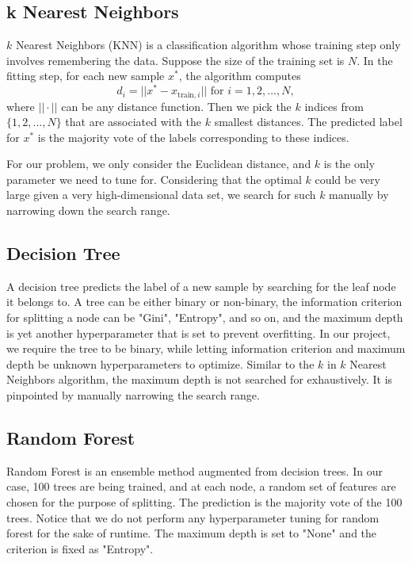\documentclass[10pt,twocolumn,letterpage]{article}
\begin{document}
		\subsection{k Nearest Neighbors}
			$k$ Nearest Neighbors (KNN) is a classification algorithm whose training step only involves remembering the data. Suppose the size of the training set is $N$. In the fitting step, for each new sample $x^*$, the algorithm computes $$d_i = ||x^* - x_{\text{train},i}|| \text{ for } i = 1,2,...,N,$$ where $||\cdot||$ can be any distance function. Then we pick the $k$ indices from $\{1,2,...,N\}$ that are associated with the $k$ smallest distances. The predicted label for $x^*$ is the majority vote of the labels corresponding to these indices. 
			
			For our problem, we only consider the Euclidean distance, and $k$ is the only parameter we need to tune for. Considering that the optimal $k$ could be very large given a very high-dimensional data set, we search for such $k$ manually by narrowing down the search range.
		\subsection{Decision Tree}
			A decision tree predicts the label of a new sample by searching for the leaf node it belongs to. A tree can be either binary or non-binary, the information criterion for splitting a node can be "Gini", "Entropy", and so on, and the maximum depth is yet another hyperparameter that is set to prevent overfitting. In our project, we require the tree to be binary, while letting information criterion and maximum depth be unknown hyperparameters to optimize. Similar to the $k$ in $k$ Nearest Neighbors algorithm, the maximum depth is not searched for exhaustively. It is pinpointed by manually narrowing the search range.
		\subsection{Random Forest}
			Random Forest is an ensemble method augmented from decision trees. In our case, 100 trees are being trained, and at each node, a random set of features are chosen for the purpose of splitting. The prediction is the majority vote of the 100 trees. Notice that we do not perform any hyperparameter tuning for random forest for the sake of runtime. The maximum depth is set to "None" and the criterion is fixed as "Entropy".
\end{document}
